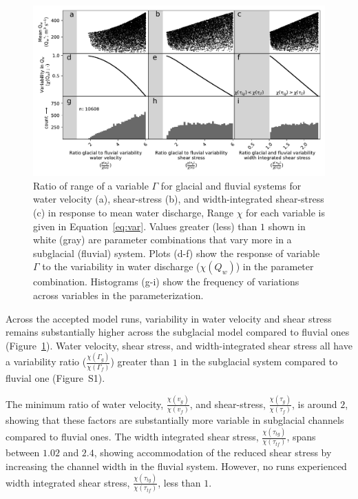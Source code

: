 \documentclass[11pt]{article}
\begin{document}
\begin{spacing}{1}
  
  \begin{center}
    \begin{figure}[H]
      \includegraphics[width=0.9\linewidth]{multi_run.pdf}
      \caption{Ratio of range of a variable $\Gamma$ for glacial and fluvial systems for water velocity  (a), shear-stress (b), and  width-integrated shear-stress (c) in response to mean water discharge,
        Range  $\chi$ for each variable is given in Equation~\ref{eq:var}. Values greater (less) than $1$ shown in white (gray) are parameter combinations that vary more in a subglacial (fluvial) system. Plots (d-f) show the response of variable $\Gamma$ to the variability in water discharge ($\chi(Q_w)$) in the parameter combination. 
        Histograms (g-i) show the frequency of variations across variables in the parameterization.}
      \label{fig:range}
    \end{figure}
  \end{center}

  Across the accepted model runs, variability in water velocity and shear stress remains substantially higher across the subglacial model compared to fluvial ones (Figure~\ref{fig:range}).
  Water velocity, shear stress, and width-integrated shear stress all have a variability ratio ($\frac{\chi(\Gamma_{g})}{\chi(\Gamma_f)}$) greater than $1$ in the subglacial  system compared to fluvial one (Figure~S1).
  
  The minimum ratio of  water velocity, $\frac{\chi(v_{g})}{\chi(v_{f})}$, and shear-stress, $\frac{\chi(\tau_{g})}{\chi(\tau_{f})}$, is around $2$, showing that these factors are substantially more variable in subglacial channels compared to fluvial ones.
  The width integrated shear stress, $\frac{\chi(\tau_{tg})}{\chi( \tau_{tf})}$, spans between $1.02$ and $2.4$, showing  accommodation of the reduced shear stress by increasing the channel width in the fluvial system.
  However, no runs experienced width integrated shear stress, $\frac{\chi(\tau_{tg})}{\chi( \tau_{tf})}$, less than $1$.
  

\end{spacing}
\end{document}
